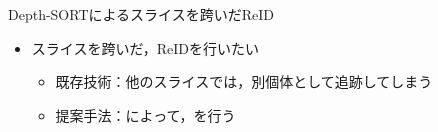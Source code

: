 \begin{frame}[noframenumbering]{Depth-SORTによるスライスを跨いだReID}
    \begin{itemize}
        \item スライスを跨いだ，ReIDを行いたい
        \begin{itemize}
            \item 既存技術：他のスライスでは，別個体として追跡してしまう
            \item[\red{$\blacktriangleright$}] 提案手法：によって，を行う
        \end{itemize}
    \end{itemize}
\end{frame}
